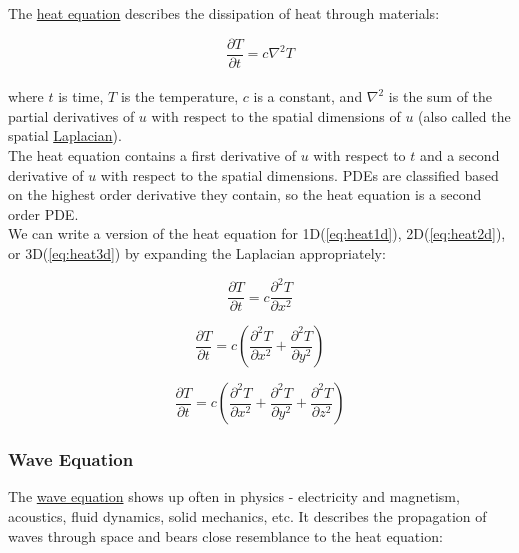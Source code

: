 {The \href{https://en.wikipedia.org/wiki/Heat_equation}{heat equation} describes the dissipation of heat through materials:

 \begin{equation}\label{eq:heatEq}
 \frac{\partial T}{\partial t} = c\nabla^{2}T
   \end{equation}
     \\
    where $t$ is time, $T$ is the temperature, $c$ is a constant, and $\nabla^{2}$ is the sum of the partial derivatives of $u$ with respect to the spatial dimensions of $u$ (also called the spatial \href{https://en.wikipedia.org/wiki/Laplace_operator}{Laplacian}).\\
    
    The heat equation contains a first derivative of $u$ with respect to $t$ and a second derivative of $u$ with respect to the spatial dimensions.  PDEs are classified based on the highest order derivative they contain, so the heat equation is a second order PDE.\\
    
     We can write a version of the heat equation for 1D(\ref{eq:heat1d}), 2D(\ref{eq:heat2d}), or 3D(\ref{eq:heat3d}) by expanding the Laplacian appropriately:
 
 \begin{equation}\label{eq:heat1d}
  \frac{\partial T}{\partial t} = c\frac{\partial^{2}T}{\partial x^{2}}
  \end{equation}
  
   \begin{equation}\label{eq:heat2d}
  \frac{\partial T}{\partial t} = c\left(\frac{\partial^{2}T}{\partial x^{2}}+\frac{\partial^{2}T}{\partial y^{2}}\right)
  \end{equation}
  
   \begin{equation}\label{eq:heat3d}
  \frac{\partial T}{ \partial t} = c\left(\frac{\partial^{2}T}{\partial x^{2}}+\frac{\partial^{2}T}{\partial y^{2}}+\frac{\partial^{2}T}{\partial z^{2}} \right)
  \end{equation}
  
\subsubsection{Wave Equation}

 The \href{https://en.wikipedia.org/wiki/Wave_equation}{wave equation} shows up often in physics - electricity and magnetism, acoustics, fluid dynamics, solid mechanics, etc.  It describes the propagation of waves through space and bears close resemblance to the heat equation:

}
